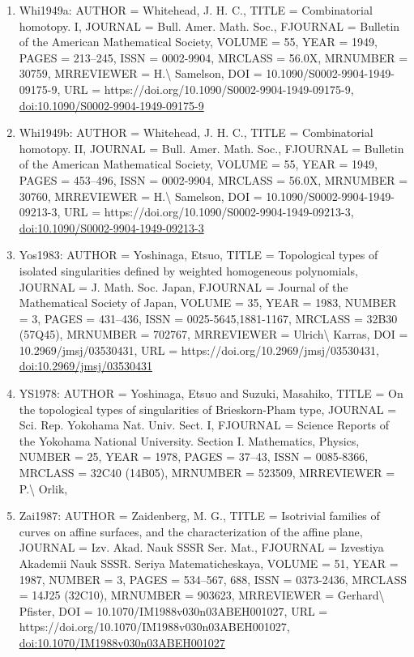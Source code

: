 \documentclass[11pt]{article}
\begin{document}
\begin{enumerate}[leftmargin=*]
  \item Whi1949a: AUTHOR = Whitehead, J. H. C., TITLE = Combinatorial homotopy. I, JOURNAL = Bull. Amer. Math. Soc., FJOURNAL = Bulletin of the American Mathematical Society, VOLUME = 55, YEAR = 1949, PAGES = 213--245, ISSN = 0002-9904, MRCLASS = 56.0X, MRNUMBER = 30759, MRREVIEWER = H.\textbackslash{} Samelson, DOI = 10.1090/S0002-9904-1949-09175-9, URL = https://doi.org/10.1090/S0002-9904-1949-09175-9, \href{https://doi.org/10.1090/S0002-9904-1949-09175-9}{doi:10.1090/S0002-9904-1949-09175-9}
  \item Whi1949b: AUTHOR = Whitehead, J. H. C., TITLE = Combinatorial homotopy. II, JOURNAL = Bull. Amer. Math. Soc., FJOURNAL = Bulletin of the American Mathematical Society, VOLUME = 55, YEAR = 1949, PAGES = 453--496, ISSN = 0002-9904, MRCLASS = 56.0X, MRNUMBER = 30760, MRREVIEWER = H.\textbackslash{} Samelson, DOI = 10.1090/S0002-9904-1949-09213-3, URL = https://doi.org/10.1090/S0002-9904-1949-09213-3, \href{https://doi.org/10.1090/S0002-9904-1949-09213-3}{doi:10.1090/S0002-9904-1949-09213-3}
  \item Yos1983: AUTHOR = Yoshinaga, Etsuo, TITLE = Topological types of isolated singularities defined by weighted homogeneous polynomials, JOURNAL = J. Math. Soc. Japan, FJOURNAL = Journal of the Mathematical Society of Japan, VOLUME = 35, YEAR = 1983, NUMBER = 3, PAGES = 431--436, ISSN = 0025-5645,1881-1167, MRCLASS = 32B30 (57Q45), MRNUMBER = 702767, MRREVIEWER = Ulrich\textbackslash{} Karras, DOI = 10.2969/jmsj/03530431, URL = https://doi.org/10.2969/jmsj/03530431, \href{https://doi.org/10.2969/jmsj/03530431}{doi:10.2969/jmsj/03530431}
  \item YS1978: AUTHOR = Yoshinaga, Etsuo and Suzuki, Masahiko, TITLE = On the topological types of singularities of Brieskorn-Pham type, JOURNAL = Sci. Rep. Yokohama Nat. Univ. Sect. I, FJOURNAL = Science Reports of the Yokohama National University. Section I. Mathematics, Physics, NUMBER = 25, YEAR = 1978, PAGES = 37--43, ISSN = 0085-8366, MRCLASS = 32C40 (14B05), MRNUMBER = 523509, MRREVIEWER = P.\textbackslash{} Orlik,
  \item Zai1987: AUTHOR = Zaidenberg, M. G., TITLE = Isotrivial families of curves on affine surfaces, and the characterization of the affine plane, JOURNAL = Izv. Akad. Nauk SSSR Ser. Mat., FJOURNAL = Izvestiya Akademii Nauk SSSR. Seriya Matematicheskaya, VOLUME = 51, YEAR = 1987, NUMBER = 3, PAGES = 534--567, 688, ISSN = 0373-2436, MRCLASS = 14J25 (32C10), MRNUMBER = 903623, MRREVIEWER = Gerhard\textbackslash{} Pfister, DOI = 10.1070/IM1988v030n03ABEH001027, URL = https://doi.org/10.1070/IM1988v030n03ABEH001027, \href{https://doi.org/10.1070/IM1988v030n03ABEH001027}{doi:10.1070/IM1988v030n03ABEH001027}
\end{enumerate}

% 
% 
\end{document}
